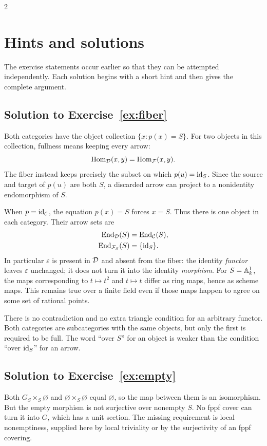 \documentclass[12pt]{memoir}
\newcommand{\BGsolution}[1]{\subsection*{Solution to Exercise~\ref{#1}}\label{sol:#1}}
\begin{document}
\begin{multicols}{2}
\raggedcolumns
\section{Hints and solutions}\label{sec:solutions}

The exercise statements occur earlier so that they can be attempted
independently. Each solution begins with a short hint and then gives
the complete argument.

\BGsolution{ex:fiber}
Both categories have the object collection $\{x:p(x)=S\}$. For two
objects in this collection, fullness means keeping every arrow:
\[
 \operatorname{Hom}_{\mathcal{D}}(x,y)=\operatorname{Hom}_{\mathcal{F}}(x,y).
\]
The fiber instead keeps precisely the subset on which $p(u)=\operatorname{id}_S$.
Since the source and target of $p(u)$ are both $S$, a discarded arrow
can project to a nonidentity endomorphism of $S$.

When $p=\operatorname{id}_{\mathcal{C}}$, the equation $p(x)=S$ forces $x=S$. Thus there
is one object in each category. Their arrow sets are
\[
\begin{aligned}
 \operatorname{End}_{\mathcal{D}}(S)&=\operatorname{End}_{\mathcal{C}}(S),\\
 \operatorname{End}_{\mathcal{F}_S}(S)&=\{\operatorname{id}_S\}.
\end{aligned}
\]
In particular $\varepsilon$ is present in $\mathcal{D}$ and absent from the
fiber: the identity \emph{functor} leaves $\varepsilon$ unchanged;
it does not turn it into the identity \emph{morphism}. For
$S=\mathbb{A}^1_k$, the maps corresponding to $t\mapsto t^2$ and
$t\mapsto t$ differ as ring maps, hence as scheme maps. This remains
true over a finite field even if those maps happen to agree on some
set of rational points.

There is no contradiction and no extra triangle condition for an
arbitrary functor. Both categories are subcategories with the same
objects, but only the first is required to be full. The word
``over $S$'' for an object is weaker than the condition ``over
$\operatorname{id}_S$'' for an arrow.

\BGsolution{ex:empty}
Both $G_S\times_S\varnothing$ and
$\varnothing\times_S\varnothing$ equal $\varnothing$, so the map
between them is an isomorphism. But the empty morphism is not surjective
over nonempty $S$. No fppf cover can turn it into $G$, which has a unit
section. The missing requirement is local nonemptiness, supplied here
by local triviality or by the surjectivity of an fppf covering.


\end{multicols}
\end{document}
